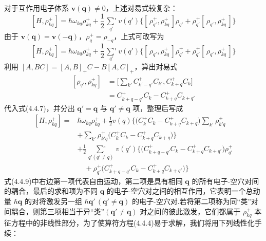 对于互作用电子体系 $\boldsymbol{v}(\boldsymbol{q})\neq 0$，上述对易式较复杂：
\begin{equation}
  \left[H,\rho_{kq}^{+}\right]=\hbar\omega_{kq}\rho_{kq}^{+}
  +\frac{1}{2}\mathop{{\sum}'}\limits_{q'}v(q')
  \big\{\left[\,\rho_{q'}^{+},\rho_{kq}^{+}\,\right]\rho_{q'}
  +\rho_{q'}^{+}\left[\,\rho_{q'},\rho_{kq}^{+}\,\right]\big\}
\end{equation}
由于 $\boldsymbol{v}(\boldsymbol{q})=\boldsymbol{v}(-\boldsymbol{q})$，$\rho_{q}^{+}=\rho_{-q}$，上式可改写为
\begin{equation}
  \left[H,\rho_{kq}^{+}\right]=\hbar\omega_{kq}\rho_{kq}^{+}
  +\frac{1}{2}\mathop{{\sum}'}\limits_{q'}v(q')
  \big\{\left[\,\rho_{q'},\rho_{kq}^{+}\,\right]\rho_{q'}^{+}
  +\rho_{q'}^{+}\left[\,\rho_{q'},\rho_{kq}^{+}\,\right]\big\}
\end{equation}
利用 $\left[A,BC\right]=\left[A,B\right]_{+}C-B\left[A,C\right]_{+}$，算出对易式
\begin{equation}
\begin{aligned}
  \left[\rho_{q'},\rho_{kq}^{+}\right]
  &=\Big[\sum_{k'}C_{k'-q'}^{+}C_{k'},C_{k+q}^{+}C_{k}\Big]\\
  &=C_{k+q-q'}^{+}C_{k}-C_{k+q}^{+}C_{k+q'}
\end{aligned}
\end{equation}
代入式(4.4.7)，并分出 $\boldsymbol{q}'=\boldsymbol{q}$ 与 $\boldsymbol{q}'\neq\boldsymbol{q}$ 项，整理后写成
\begin{equation}
\begin{aligned}
  \left[H,\rho_{kq}^{+}\right]={}&\hbar\omega_{kq}\rho_{kq}^{+}
  +\frac{1}{2}v(q)\big\{\big(C_{k}^{+}C_{k}-C_{k+q}^{+}C_{k+q}\big)\sum_{k'}\rho_{k'q}^{+}\\
  &+\sum_{k'}\rho_{k'q}^{+}\big(C_{k}^{+}C_{k}-C_{k+q}^{+}C_{k+q}\big)\big\}\\
  &+\frac{1}{2}\mathop{{\sum}'}\limits_{q'(q'\neq q)}v(q')
  \big\{\big(C_{k+q-q'}^{+}C_{k}-C_{k+q}^{+}C_{k+q'}\big)\rho_{q'}^{+}\\
  &\quad+\rho_{q'}^{+}\big(C_{k+q-q'}^{+}C_{k}-C_{k+q}^{+}C_{k+q'}\big)\big\}
\end{aligned}
\end{equation}
式(4.4.9)中右边第一项代表自由运动，第二项是具有相同 $\boldsymbol{q}$ 的所有电子-空穴对间的耦合，最后的求和项为不同 $\boldsymbol{q}$ 的电子-空穴对之间的相互作用，它表明一个总动量 $\hbar\boldsymbol{q}$ 的对将激发另一组 $\hbar\boldsymbol{q}'\,(\boldsymbol{q}'\neq\boldsymbol{q})$ 的电子-空穴对.若将第二项称为同“类”对间耦合，则第三项相当于异“类”$(\boldsymbol{q}'\neq\boldsymbol{q})$ 对之间的彼此激发，它们都属于 $\rho_{kq}^{+}$ 本征方程中的非线性部分，为了使算符方程(4.4.4)易于求解，我们将用下列线性化手续：


